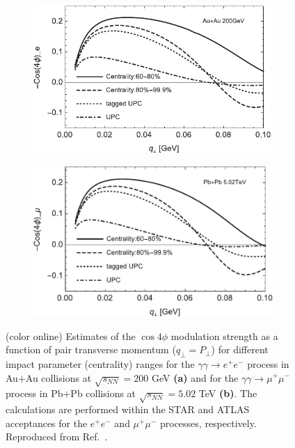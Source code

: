 \documentclass[twocolumn,epjc3]{svjour3}\sloppy
\begin{document}
\begin{figure}
    \centering
    \begin{subfigure}{.50\textwidth}
      \centering
      \includegraphics[width=0.99\textwidth]{fig/fig_7-crop.pdf}
      \caption{}
    \end{subfigure}%
    \begin{subfigure}{.50\textwidth}
      \centering
      \includegraphics[width=.99\linewidth]{fig/fig_12-crop.pdf}
      \caption{}
    \end{subfigure}
    \caption{(color online) Estimates of the $\cos4\phi$ modulation strength as a function of pair transverse momentum ($q_\perp = P_\perp$) for different impact parameter (centrality) ranges for the $\gamma\gamma \rightarrow e^+e^-$ process in Au$+$Au collisions at $\sqrt{s_{NN}}=200$ GeV \textbf{(a)} and for the $\gamma\gamma \rightarrow \mu^+\mu^-$ process in Pb$+$Pb collisions at $\sqrt{s_{NN}}=5.02$ TeV \textbf{(b)}. The calculations are performed within the STAR and ATLAS acceptances for the $e^+e^-$ and $\mu^+\mu^-$ processes, respectively. Reproduced from Ref.~\cite{liImpactParameterDependence2020}. }
    \label{fig:li_polarization}
\end{figure}
\end{document}
